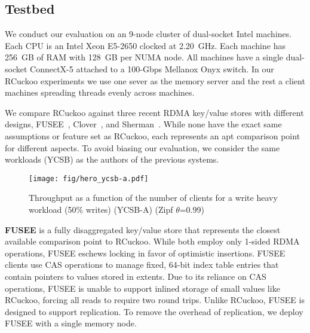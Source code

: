 \subsection{Testbed}

We conduct our evaluation on an 9-node cluster of dual-socket Intel
machines. Each CPU is an Intel Xeon E5-2650 clocked at
2.20~GHz. Each machine has 256~GB of RAM with 128~GB per NUMA
node. All machines have a single dual-socket ConnectX-5 attached to a
100-Gbps Mellanox Onyx switch. In our RCuckoo experiments we use one
sever as the memory server and the rest a client machines
spreading threads evenly across machines.


We compare RCuckoo against three recent RDMA key/value stores with
different designs, FUSEE~\cite{fusee}, Clover~\cite{clover}, and
Sherman~\cite{sherman}.  While none have the exact same assumptions or
feature set as RCuckoo, each represents an apt comparison point for
different aspects.  To avoid biasing our evaluation, we consider the same
workloads (YCSB) as the authors of the previous systems.
%

\begin{figure}
  \center
  \texttt{[image: fig/hero\_ycsb-a.pdf]}
  \caption{Throughput as a function of the number of clients for a write heavy workload (50\% writes) (YCSB-A) (Zipf $\theta$=0.99)}
  \label{fig:ycsb_throughput_a}
\end{figure}


\textbf{FUSEE} is a fully disaggregated key/value store that
represents the closest available comparison point to RCuckoo.  While
both employ only 1-sided RDMA operations, FUSEE eschews locking in
favor of optimistic insertions.  FUSEE clients use CAS operations
to manage fixed, 64-bit index table entries that contain pointers to
values stored in extents.  Due to its reliance on CAS operations, FUSEE is unable to support inlined storage of small
values like RCuckoo, forcing all reads to require two round trips.
Unlike RCuckoo, FUSEE is designed to support replication.  To remove the overhead of replication, 
we deploy FUSEE with a single memory node.

